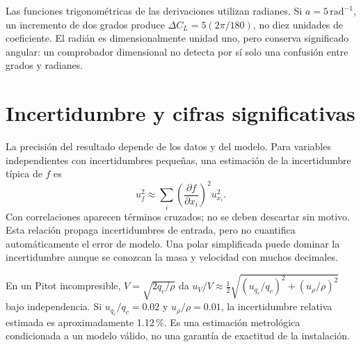 Las funciones trigonométricas de las derivaciones utilizan radianes. Si $a=5\,\mathrm{rad^{-1}}$, un incremento de dos grados produce $\Delta C_L=5(2\pi/180)$, no diez unidades de coeficiente. El radián es dimensionalmente unidad uno, pero conserva significado angular: un comprobador dimensional no detecta por sí solo una confusión entre grados y radianes.

\section{Incertidumbre y cifras significativas}
La precisión del resultado depende de los datos y del modelo. Para variables independientes con incertidumbres pequeñas, una estimación de la incertidumbre típica de $f$ es
\begin{equation}
u_f^2\approx\sum_i\left(\frac{\partial f}{\partial x_i}\right)^2u_{x_i}^2.
\end{equation}
Con correlaciones aparecen términos cruzados; no se deben descartar sin motivo. Esta relación propaga incertidumbres de entrada, pero no cuantifica automáticamente el error de modelo. Una polar simplificada puede dominar la incertidumbre aunque se conozcan la masa y velocidad con muchos decimales.

En un Pitot incompresible, $V=\sqrt{2q_c/\rho}$ da $u_V/V\approx\frac12\sqrt{(u_{q_c}/q_c)^2+(u_\rho/\rho)^2}$ bajo independencia. Si $u_{q_c}/q_c=0.02$ y $u_\rho/\rho=0.01$, la incertidumbre relativa estimada es aproximadamente 1.12\,\%. Es una estimación metrológica condicionada a un modelo válido, no una garantía de exactitud de la instalación.

